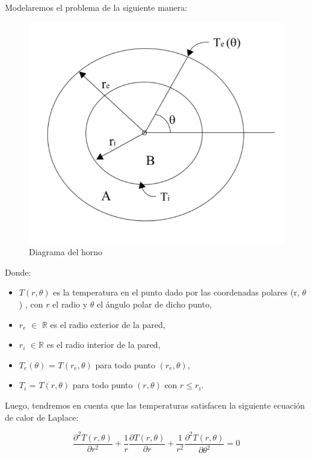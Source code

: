Modelaremos el problema de la siguiente manera: 

\begin{figure}[H]
    \centering
     \includegraphics[scale=0.30]{img/alto_horno.png}
    \caption{ Diagrama del horno}
    \label{fig:diagrama_horno}
\end{figure} 

Donde: 
\begin{itemize}
    \item $T(r, \theta)$ es la temperatura en el punto dado por las coordenadas polares (r, $\theta$) , con $r$ el radio y $\theta$ el ángulo polar de dicho punto,
    \item $r_e$ $ \in$ $\mathbb{R}$  es el radio exterior de la pared,
    \item $r_i$ $\in \mathbb{R}$ es el radio interior de la pared,
     \item $T_{e}(\theta)$ = $T(r_{e},\theta)$ para todo punto $(r_{e}, \theta)$,
    \item $T_{i}$ = $T(r,\theta)$ para todo punto $(r, \theta)$ con $ r \leq r_{i}$.
\end{itemize}
   Luego, tendremos en cuenta que las temperaturas satisfacen la siguiente ecuación de calor de Laplace:

\begin{equation}\label{ecuacion_calor}
    \frac{\partial^{2} T(r, \theta)}{\partial r^{2}} + \frac{1}{r} \frac{\partial T(r, \theta)}{\partial r} +
    \frac{1}{r^{2}} \frac{\partial^{2} T(r, \theta)}{\partial \theta ^{2}} = 0
\end{equation}

